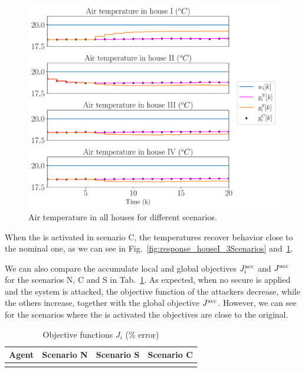 \documentclass[../main.tex]{subfiles}
\begin{document}
\begin{figure}[h]
  \centering
 \includegraphics[width=.7\textwidth,trim=0 .3cm 0 .2cm,clip]{../img/resilient_eq/ErrorWX_command_normErrH_all_houses.pdf}
  \caption{Air temperature in all houses for different scenarios.}\label{fig:response_housesII_to_IV_3Scenarios}
\end{figure}

When the \rpdmpcss{} is activated in scenario C, the temperatures recover behavior close to the nominal one, as we can see in Fig.~\ref{fig:response_houseI_3Scenarios} and~\ref{fig:response_housesII_to_IV_3Scenarios}.


We can also compare the accumulate local and global objectives $J_{i}^{\text{acc}}$ and $J^{\text{acc}}$ for the scenarios N, C and S in Tab.~\ref{tab:eq_costsGlobalLocal}.
As expected, when no secure \dmpc{} is applied and the system is attacked, the objective function of the attackers decrease, while the others increase, together with the global objective $J^{\text{acc}}$.
However, we can see for the scenarios where the \rpdmpcss{} is activated the objectives are close to the original.

\begin{table}[h]
  \centering
  \caption{Objective functions $J_{i}$ (\% error)}\label{tab:eq_costsGlobalLocal}
  \begin{tabular}[t]{cccc}
    \toprule
    Agent  & Scenario N& Scenario S & Scenario C\\
    \midrule
    \\
    \bottomrule
  \end{tabular}
\end{table}
\end{document}
